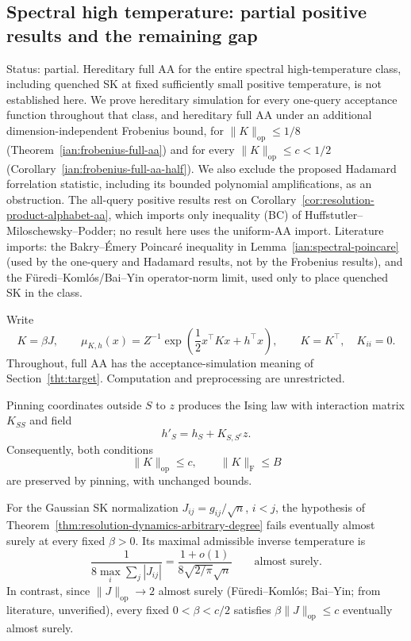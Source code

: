 \subsection{Spectral high temperature: partial positive results and the remaining gap}
\label{ian:spectral-high-temperature}

Status: partial. Hereditary full AA for the entire spectral high-temperature class, including quenched SK at fixed sufficiently small positive temperature, is not established here. We prove hereditary simulation for every one-query acceptance function throughout that class, and hereditary full AA under an additional dimension-independent Frobenius bound, for \(\|K\|_{\mathrm{op}}\le1/8\) (Theorem~\ref{ian:frobenius-full-aa}) and for every \(\|K\|_{\mathrm{op}}\le c<1/2\) (Corollary~\ref{ian:frobenius-full-aa-half}). We also exclude the proposed Hadamard forrelation statistic, including its bounded polynomial amplifications, as an obstruction. The all-query positive results rest on Corollary~\ref{cor:resolution-product-alphabet-aa}, which imports only inequality (BC) of Huffstutler--Miloschewsky--Podder; no result here uses the uniform-AA import. Literature imports: the Bakry--\'Emery Poincar\'e inequality in Lemma~\ref{ian:spectral-poincare} (used by the one-query and Hadamard results, not by the Frobenius results), and the F\"uredi--Koml\'os/Bai--Yin operator-norm limit, used only to place quenched SK in the class.

Write
\[
 K=\beta J,\qquad
 \mu_{K,h}(x)=Z^{-1}\exp\left(\frac12x^\top Kx+h^\top x\right),
 \qquad K=K^\top,\quad K_{ii}=0.
\]
Throughout, full AA has the acceptance-simulation meaning of
Section~\ref{tht:target}. Computation and preprocessing are unrestricted.

\begin{proposition}
\label{ian:spectral-pinning-and-noncoverage}
Pinning coordinates outside \(S\) to \(z\) produces the Ising law with
interaction matrix \(K_{SS}\) and field
\[
 h'_S=h_S+K_{S,S^c}z.
\]
Consequently, both conditions
\[
 \|K\|_{\mathrm{op}}\le c,\qquad \|K\|_{\mathrm F}\le B
\]
are preserved by pinning, with unchanged bounds.

For the Gaussian SK normalization
\(J_{ij}=g_{ij}/\sqrt n\), \(i<j\), the hypothesis of
Theorem~\ref{thm:resolution-dynamics-arbitrary-degree} fails eventually
almost surely at every fixed \(\beta>0\). Its maximal admissible inverse
temperature is
\[
 \frac{1}{8\max_i\sum_j|J_{ij}|}
 =\frac{1+o(1)}{8\sqrt{2/\pi}\sqrt n}
 \qquad\text{almost surely}.
\]
In contrast, since \(\|J\|_{\mathrm{op}}\to2\) almost surely (F\"uredi--Koml\'os; Bai--Yin; from literature, unverified), every fixed \(0<\beta<c/2\) satisfies \(\beta\|J\|_{\mathrm{op}}\le c\) eventually almost surely.
\end{proposition}

